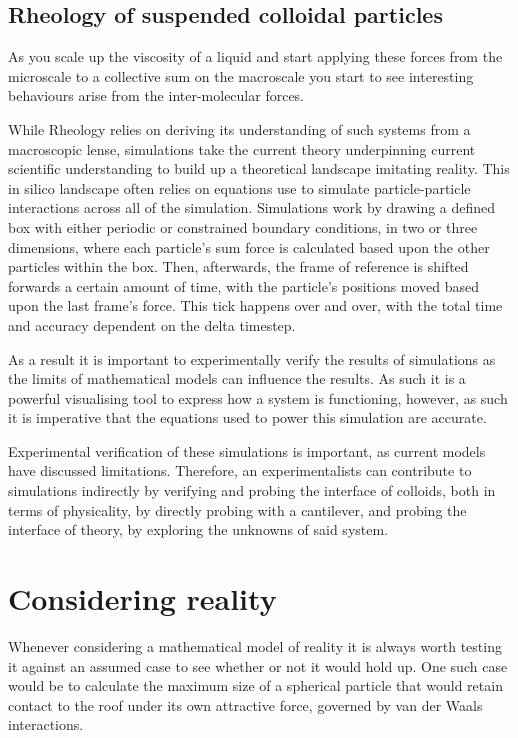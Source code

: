\subsection{Rheology of suspended colloidal particles}

As you scale up the viscosity of a liquid and start applying these forces from the microscale to a collective sum on the macroscale you start to see interesting behaviours arise from the inter-molecular forces.

While Rheology relies on deriving its understanding of such systems from a macroscopic lense, simulations take the current theory underpinning current scientific understanding to build up a theoretical landscape imitating reality. This in silico landscape often relies on equations use to simulate particle-particle interactions across all of the simulation. Simulations work by drawing a defined box with either periodic or constrained boundary conditions, in two or three dimensions, where each particle's sum force is calculated based upon the other particles within the box. Then, afterwards, the frame of reference is shifted forwards a certain amount of time, with the particle's positions moved based upon the last frame's force. This tick happens over and over, with the total time and accuracy dependent on the delta timestep.\cite{foss_brady_2000}
 
As a result it is important to experimentally verify the results of simulations as the limits of mathematical models can influence the results. As such it is a powerful visualising tool to express how a system is functioning, however, as such it is imperative that the equations used to power this simulation are accurate. 

Experimental verification of these simulations is important, as current models have discussed limitations. Therefore, an experimentalists can contribute to simulations indirectly by verifying and probing the interface of colloids, both in terms of physicality, by directly probing with a cantilever, and probing the interface of theory, by exploring the unknowns of said system. \cite{SmartMats, Rheo2}


\section{Considering reality}

Whenever considering a mathematical model of reality it is always worth testing it against an assumed case to see whether or not it would hold up. One such case would be to calculate the maximum size of a spherical particle that would retain contact to the roof under its own attractive force, governed by van der Waals interactions.

